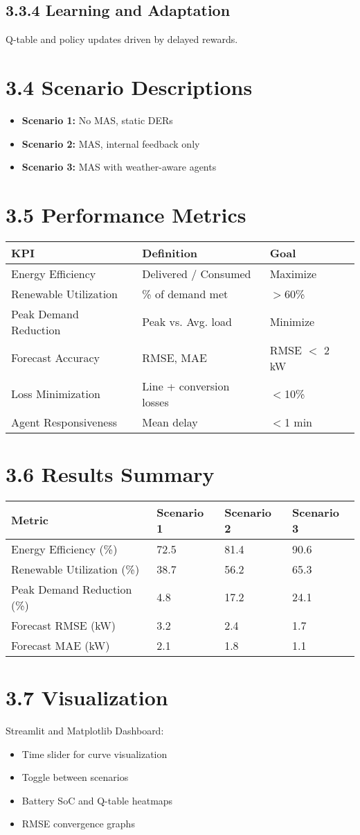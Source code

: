 \documentclass[12pt]{report}
\begin{document}
\subsection*{3.3.4 Learning and Adaptation}
Q-table and policy updates driven by delayed rewards.

\section*{3.4 Scenario Descriptions}
\begin{itemize}
    \item \textbf{Scenario 1:} No MAS, static DERs
    \item \textbf{Scenario 2:} MAS, internal feedback only
    \item \textbf{Scenario 3:} MAS with weather-aware agents
\end{itemize}

\section*{3.5 Performance Metrics}

\begin{longtable}{@{}lll@{}}
\toprule
\textbf{KPI} & \textbf{Definition} & \textbf{Goal} \\
\midrule
Energy Efficiency & Delivered / Consumed & Maximize \\
Renewable Utilization & \% of demand met & $>$60\% \\
Peak Demand Reduction & Peak vs. Avg. load & Minimize \\
Forecast Accuracy & RMSE, MAE & RMSE $<$ 2 kW \\
Loss Minimization & Line + conversion losses & $<$10\% \\
Agent Responsiveness & Mean delay & $<$1 min \\
\bottomrule
\end{longtable}

\section*{3.6 Results Summary}

\begin{longtable}{@{}llll@{}}
\toprule
\textbf{Metric} & \textbf{Scenario 1} & \textbf{Scenario 2} & \textbf{Scenario 3} \\
\midrule
Energy Efficiency (\%) & 72.5 & 81.4 & 90.6 \\
Renewable Utilization (\%) & 38.7 & 56.2 & 65.3 \\
Peak Demand Reduction (\%) & 4.8 & 17.2 & 24.1 \\
Forecast RMSE (kW) & 3.2 & 2.4 & 1.7 \\
Forecast MAE (kW) & 2.1 & 1.8 & 1.1 \\
\bottomrule
\end{longtable}

\section*{3.7 Visualization}
Streamlit and Matplotlib Dashboard:
\begin{itemize}
    \item Time slider for curve visualization
    \item Toggle between scenarios
    \item Battery SoC and Q-table heatmaps
    \item RMSE convergence graphs
\end{itemize}
\end{document}
